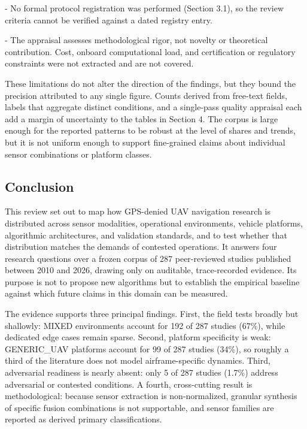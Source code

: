\documentclass[conference]{IEEEtran}
\begin{document}
- No formal protocol registration was performed (Section 3.1), so the review criteria cannot be verified against a dated registry entry.

- The appraisal assesses methodological rigor, not novelty or theoretical contribution. Cost, onboard computational load, and certification or regulatory constraints were not extracted and are not covered.


These limitations do not alter the direction of the findings, but they bound the precision attributed to any single figure. Counts derived from free-text fields, labels that aggregate distinct conditions, and a single-pass quality appraisal each add a margin of uncertainty to the tables in Section 4. The corpus is large enough for the reported patterns to be robust at the level of shares and trends, but it is not uniform enough to support fine-grained claims about individual sensor combinations or platform classes.


\subsection{Conclusion}


This review set out to map how GPS-denied UAV navigation research is distributed across sensor modalities, operational environments, vehicle platforms, algorithmic architectures, and validation standards, and to test whether that distribution matches the demands of contested operations. It answers four research questions over a frozen corpus of 287 peer-reviewed studies published between 2010 and 2026, drawing only on auditable, trace-recorded evidence. Its purpose is not to propose new algorithms but to establish the empirical baseline against which future claims in this domain can be measured.


The evidence supports three principal findings. First, the field tests broadly but shallowly: MIXED environments account for 192 of 287 studies (67\%), while dedicated edge cases remain sparse. Second, platform specificity is weak: GENERIC\_UAV platforms account for 99 of 287 studies (34\%), so roughly a third of the literature does not model airframe-specific dynamics. Third, adversarial readiness is nearly absent: only 5 of 287 studies (1.7\%) address adversarial or contested conditions. A fourth, cross-cutting result is methodological: because sensor extraction is non-normalized, granular synthesis of specific fusion combinations is not supportable, and sensor families are reported as derived primary classifications.
\end{document}
